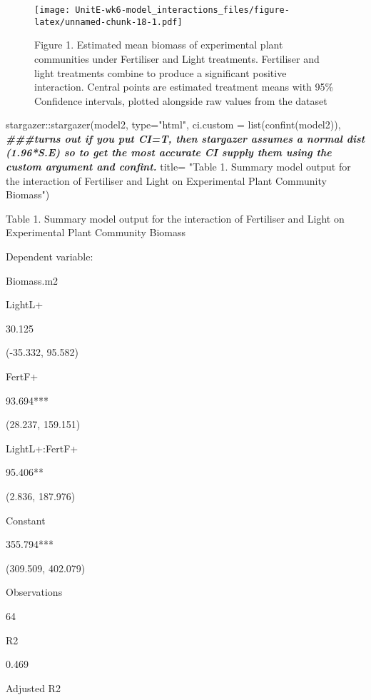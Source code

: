 \documentclass[
]{article}
\newenvironment{Shaded}{\begin{snugshade}}{\end{snugshade}}
\newcommand{\AttributeTok}[1]{\textcolor[rgb]{0.77,0.63,0.00}{#1}}
\newcommand{\DocumentationTok}[1]{\textcolor[rgb]{0.56,0.35,0.01}{\textbf{\textit{#1}}}}
\newcommand{\FunctionTok}[1]{\textcolor[rgb]{0.00,0.00,0.00}{#1}}
\newcommand{\NormalTok}[1]{#1}
\newcommand{\SpecialCharTok}[1]{\textcolor[rgb]{0.00,0.00,0.00}{#1}}
\newcommand{\StringTok}[1]{\textcolor[rgb]{0.31,0.60,0.02}{#1}}
\begin{document}
\begin{figure}
\centering
\texttt{[image: UnitE-wk6-model\_interactions\_files/figure-latex/unnamed-chunk-18-1.pdf]}
\caption{Figure 1. Estimated mean biomass of experimental plant
communities under Fertiliser and Light treatments. Fertiliser and light
treatments combine to produce a significant positive interaction.
Central points are estimated treatment means with 95\% Confidence
intervals, plotted alongside raw values from the dataset}
\end{figure}

\begin{Shaded}
\begin{Highlighting}[]
\NormalTok{stargazer}\SpecialCharTok{::}\FunctionTok{stargazer}\NormalTok{(model2, }
                     \AttributeTok{type=}\StringTok{"html"}\NormalTok{, }
                     \AttributeTok{ci.custom =} \FunctionTok{list}\NormalTok{(}\FunctionTok{confint}\NormalTok{(model2)), }\DocumentationTok{\#\#\#turns out if you put CI=T, then stargazer assumes a normal dist (1.96*S.E) so to get the most accurate CI supply them using the custom argument and confint. }
                     \AttributeTok{title=} \StringTok{"Table 1. Summary model output for the interaction of Fertiliser and Light on Experimental Plant Community Biomass"}\NormalTok{)}
\end{Highlighting}
\end{Shaded}

Table 1. Summary model output for the interaction of Fertiliser and
Light on Experimental Plant Community Biomass

Dependent variable:

Biomass.m2

LightL+

30.125

(-35.332, 95.582)

FertF+

93.694***

(28.237, 159.151)

LightL+:FertF+

95.406**

(2.836, 187.976)

Constant

355.794***

(309.509, 402.079)

Observations

64

R2

0.469

Adjusted R2
\end{document}
